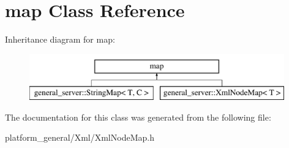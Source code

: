 \hypertarget{classmap}{\section{map \-Class \-Reference}
\label{classmap}
}
\-Inheritance diagram for map\-:\begin{figure}[H]
\begin{center}
\leavevmode
\includegraphics[height=2.000000cm]{classmap}
\end{center}
\end{figure}


\-The documentation for this class was generated from the following file\-:\begin{DoxyCompactItemize}
\item 
platform\-\_\-general/\-Xml/\-Xml\-Node\-Map.\-h\end{DoxyCompactItemize}
